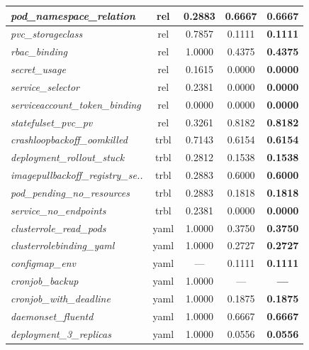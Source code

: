 \begin{footnotesize}
\begin{longtable}{|p{3.6cm}|c|c|c|c|}
\textit{pod\_\allowbreak{}namespace\_\allowbreak{}relation} & rel & 0.2883 & 0.6667 & \textbf{0.6667} \\
\hline
\textit{pvc\_\allowbreak{}storageclass} & rel & 0.7857 & 0.1111 & \textbf{0.1111} \\
\hline
\textit{rbac\_\allowbreak{}binding} & rel & 1.0000 & 0.4375 & \textbf{0.4375} \\
\hline
\textit{secret\_\allowbreak{}usage} & rel & 0.1615 & 0.0000 & \textbf{0.0000} \\
\hline
\textit{service\_\allowbreak{}selector} & rel & 0.2381 & 0.0000 & \textbf{0.0000} \\
\hline
\textit{serviceaccount\_\allowbreak{}token\_\allowbreak{}binding} & rel & 0.0000 & 0.0000 & \textbf{0.0000} \\
\hline
\textit{statefulset\_\allowbreak{}pvc\_\allowbreak{}pv} & rel & 0.3261 & 0.8182 & \textbf{0.8182} \\
\hline
\textit{crashloopbackoff\_\allowbreak{}oomkilled} & trbl & 0.7143 & 0.6154 & \textbf{0.6154} \\
\hline
\textit{deployment\_\allowbreak{}rollout\_\allowbreak{}stuck} & trbl & 0.2812 & 0.1538 & \textbf{0.1538} \\
\hline
\textit{imagepullbackoff\_\allowbreak{}registry\_\allowbreak{}se..} & trbl & 0.2883 & 0.6000 & \textbf{0.6000} \\
\hline
\textit{pod\_\allowbreak{}pending\_\allowbreak{}no\_\allowbreak{}resources} & trbl & 0.2883 & 0.1818 & \textbf{0.1818} \\
\hline
\textit{service\_\allowbreak{}no\_\allowbreak{}endpoints} & trbl & 0.2381 & 0.0000 & \textbf{0.0000} \\
\hline
\textit{clusterrole\_\allowbreak{}read\_\allowbreak{}pods} & yaml & 1.0000 & 0.3750 & \textbf{0.3750} \\
\hline
\textit{clusterrolebinding\_\allowbreak{}yaml} & yaml & 1.0000 & 0.2727 & \textbf{0.2727} \\
\hline
\textit{configmap\_\allowbreak{}env} & yaml & --- & 0.1111 & \textbf{0.1111} \\
\hline
\textit{cronjob\_\allowbreak{}backup} & yaml & 1.0000 & --- & \textbf{---} \\
\hline
\textit{cronjob\_\allowbreak{}with\_\allowbreak{}deadline} & yaml & 1.0000 & 0.1875 & \textbf{0.1875} \\
\hline
\textit{daemonset\_\allowbreak{}fluentd} & yaml & 1.0000 & 0.6667 & \textbf{0.6667} \\
\hline
\textit{deployment\_\allowbreak{}3\_\allowbreak{}replicas} & yaml & 1.0000 & 0.0556 & \textbf{0.0556} \\

\end{longtable}
\end{footnotesize}
